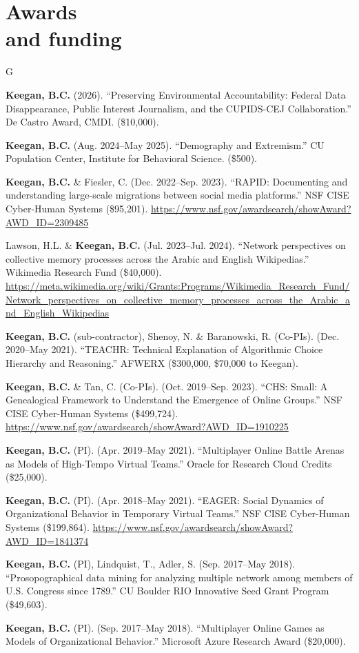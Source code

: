 \documentclass{cv}
\begin{document}
	\section{Awards\\and funding}
	\begin{entries}{G}
		\item \textbf{Keegan, B.C.} (2026). ``Preserving Environmental Accountability: Federal Data Disappearance, Public Interest Journalism, and the CUPIDS-CEJ Collaboration.'' De Castro Award, CMDI. (\$10,000).
		\item \textbf{Keegan, B.C.} (Aug. 2024--May 2025). ``Demography and Extremism.'' CU Population Center, Institute for Behavioral Science. (\$500).
		\item \textbf{Keegan, B.C.} \& Fiesler, C. (Dec. 2022--Sep. 2023). ``RAPID: Documenting and understanding large-scale migrations between social media platforms.'' NSF CISE Cyber-Human Systems (\$95,201). \url{https://www.nsf.gov/awardsearch/showAward?AWD_ID=2309485}
		\item Lawson, H.L. \& \textbf{Keegan, B.C.} (Jul. 2023--Jul. 2024). ``Network perspectives on collective memory processes across the Arabic and English Wikipedias.'' Wikimedia Research Fund (\$40,000). \url{https://meta.wikimedia.org/wiki/Grants:Programs/Wikimedia_Research_Fund/Network_perspectives_on_collective_memory_processes_across_the_Arabic_and_English_Wikipedias}
		\item \textbf{Keegan, B.C.} (sub-contractor), Shenoy, N. \& Baranowski, R. (Co-PIs). (Dec. 2020--May 2021). ``TEACHR: Technical Explanation of Algorithmic Choice Hierarchy and Reasoning.'' AFWERX (\$300,000, \$70,000 to Keegan).
		\item \textbf{Keegan, B.C.} \& Tan, C. (Co-PIs). (Oct. 2019--Sep. 2023). ``CHS: Small: A Genealogical Framework to Understand the Emergence of Online Groups.'' NSF CISE Cyber-Human Systems (\$499,724). \url{https://www.nsf.gov/awardsearch/showAward?AWD_ID=1910225}
		\item \textbf{Keegan, B.C.} (PI). (Apr. 2019--May 2021). ``Multiplayer Online Battle Arenas as Models of High-Tempo Virtual Teams.'' Oracle for Research Cloud Credits (\$25,000).
		\item \textbf{Keegan, B.C.} (PI). (Apr. 2018--May 2021). ``EAGER: Social Dynamics of Organizational Behavior in Temporary Virtual Teams.'' NSF CISE Cyber-Human Systems (\$199,864). \url{https://www.nsf.gov/awardsearch/showAward?AWD_ID=1841374}
		\item \textbf{Keegan, B.C.} (PI), Lindquist, T., Adler, S. (Sep. 2017--May 2018). ``Prosopographical data mining for analyzing multiple network among members of U.S. Congress since 1789.'' CU Boulder RIO Innovative Seed Grant Program (\$49,603).
		\item \textbf{Keegan, B.C.} (PI). (Sep. 2017--May 2018). ``Multiplayer Online Games as Models of Organizational Behavior.'' Microsoft Azure Research Award (\$20,000).
	\end{entries}
\end{document}
